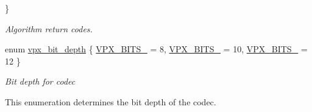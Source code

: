\begin{DoxyCompactItemize}
 \}\begin{DoxyCompactList}\small\item\em Algorithm return codes. \end{DoxyCompactList}
\item 
enum \hyperlink{group__codec_gaeb4bba376f987595b3ad11253adf86d9}{vpx\+\_\+bit\+\_\+depth} \{ \hyperlink{group__codec_ggaeb4bba376f987595b3ad11253adf86d9a664e60a9d8c84563836073d88ae1cfe8}{V\+P\+X\+\_\+\+B\+I\+T\+S\+\_} = 8, 
\hyperlink{group__codec_ggaeb4bba376f987595b3ad11253adf86d9aaecd7245969d06b539de89cf580401e1}{V\+P\+X\+\_\+\+B\+I\+T\+S\+\_} = 10, 
\hyperlink{group__codec_ggaeb4bba376f987595b3ad11253adf86d9a7d053a31e269b4d3746e88b0ff424862}{V\+P\+X\+\_\+\+B\+I\+T\+S\+\_} = 12
 \}\begin{DoxyCompactList}\small\item\em Bit depth for codec
\begin{DoxyItemize}
\item This enumeration determines the bit depth of the codec. 
\end{DoxyItemize}\end{DoxyCompactList}
\end{DoxyCompactItemize}

